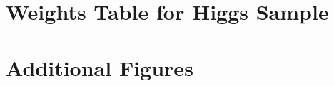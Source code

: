 \chapter{Weights Table for Higgs Sample}
\newpage\phantom{blabla}
\newpage\phantom{blabla}
\newpage\phantom{blabla}
\newpage\phantom{blabla}


\chapter{Additional Figures}
\newpage\phantom{blabla}
\newpage\phantom{blabla}
\newpage\phantom{blabla}
\newpage\phantom{blabla}
